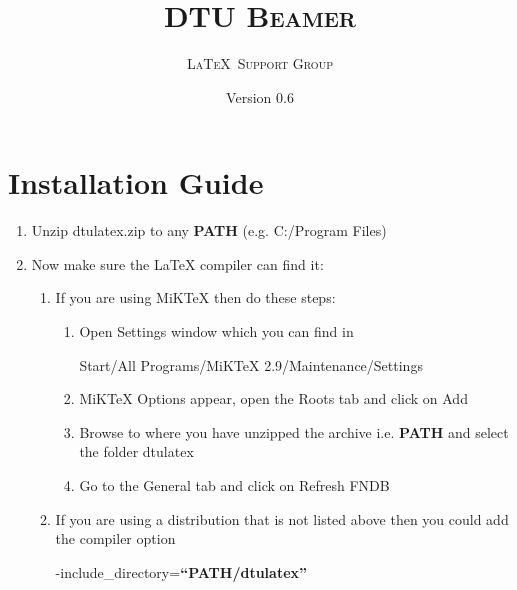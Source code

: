 \documentclass{article}
\title{\textsc{DTU Beamer}}
\author{\textsc{\LaTeX\ Support Group}}
\date{Version 0.6}
\begin{document}
        \maketitle
        \section{Installation Guide}
        \begin{enumerate}
                \item Unzip {\color{red} dtulatex.zip} to any \textbf{PATH} (e.g. {\color{blue}C:/Program Files})
                \item Now make sure the LaTeX compiler can find it:
                \begin{enumerate}
                        \item If you are using MiKTeX then do these steps:
                        \begin{enumerate}
                                \item Open {\color{red}Settings} window which you can find in
                                
                                {\color{blue} Start/All Programs/MiKTeX 2.9/Maintenance/Settings}
                                \item MiKTeX Options appear, open the {\color{blue}Roots} tab and click on {\color{blue}Add}
                                \item Browse to where you have unzipped the archive i.e. \textbf{PATH} and select the folder {\color{red} dtulatex}
                                \item Go to the {\color{blue}General} tab and click on {\color{red}Refresh FNDB}
                        \end{enumerate}
                        \item If you are using a distribution that is not listed above then you could add the compiler option
                        
                        {\color{blue}-include\_directory=\textbf{``PATH/dtulatex''}}
                \end{enumerate}
        \end{enumerate}
        
\end{document}
